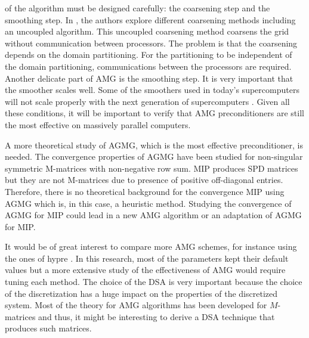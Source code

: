\begin{long_description}
    of the algorithm must be designed carefully: the coarsening step and the
    smoothing step. In \cite{mis}, the authors explore different coarsening
    methods including an uncoupled algorithm. This uncoupled coarsening method
    coarsens the grid without communication between processors. The problem
    is that the coarsening depends on the domain partitioning. For the
    partitioning to be independent of the domain partitioning, communications
    between the processors are required. Another delicate part of AMG is the
    smoothing step. It is very important that the smoother scales well. Some
    of the smoothers used in today's supercomputers will not scale properly
    with the next generation of supercomputers \cite{amg_parallel}. Given all
    these conditions, it will be important to verify that AMG preconditioners are 
    still the  most effective on massively parallel computers.
  \item[Convergence study of AGMG for MIP and development of AMG for MIP:] A 
    more theoretical study of AGMG, which is the most effective preconditioner, 
    is needed. The convergence properties of AGMG have been studied for non-singular 
    symmetric M-matrices with non-negative row sum. MIP produces SPD matrices
    but they are not M-matrices due to presence of positive off-diagonal
    entries. Therefore, there is no theoretical background for the convergence 
    MIP using AGMG which is, in this case, a heuristic method. Studying the 
    convergence of AGMG for MIP could lead in a new AMG algorithm or an adaptation 
    of AGMG for MIP.
  \item[Comparison of different AMG methods:] It would be of great interest 
    to compare more AMG schemes, for instance using the ones of hypre 
    \cite{hypre_guide}. In this research, most of the parameters kept their 
    default values but a more extensive study of the effectiveness of AMG 
    would require tuning each method. The choice of the DSA is very important 
    because the choice of the discretization has a huge impact on the properties 
    of the discretized system. Most of the theory for AMG algorithms has been 
    developed for $M$-matrices and thus, it might be interesting to derive a DSA
    technique that produces such matrices.
\end{long_description}
